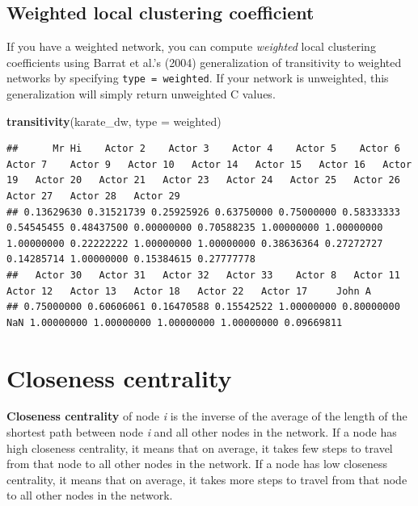 \documentclass[
]{book}
\newenvironment{Shaded}{\begin{snugshade}}{\end{snugshade}}
\newcommand{\AttributeTok}[1]{\textcolor[rgb]{0.13,0.29,0.53}{#1}}
\newcommand{\FunctionTok}[1]{\textcolor[rgb]{0.13,0.29,0.53}{\textbf{#1}}}
\newcommand{\NormalTok}[1]{#1}
\newcommand{\StringTok}[1]{\textcolor[rgb]{0.31,0.60,0.02}{#1}}
\begin{document}
\subsection{Weighted local clustering coefficient}\label{weighted-local-clustering-coefficient}

If you have a weighted network, you can compute \emph{weighted} local clustering coefficients using Barrat et al.'s (2004) generalization of transitivity to weighted networks by specifying \texttt{type\ =\ \textquotesingle{}weighted\textquotesingle{}}. If your network is unweighted, this generalization will simply return unweighted C values.

\begin{Shaded}
\begin{Highlighting}[]
\FunctionTok{transitivity}\NormalTok{(karate\_dw, }\AttributeTok{type =} \StringTok{\textquotesingle{}weighted\textquotesingle{}}\NormalTok{)}
\end{Highlighting}
\end{Shaded}

\begin{verbatim}
##      Mr Hi    Actor 2    Actor 3    Actor 4    Actor 5    Actor 6    Actor 7    Actor 9   Actor 10   Actor 14   Actor 15   Actor 16   Actor 19   Actor 20   Actor 21   Actor 23   Actor 24   Actor 25   Actor 26   Actor 27   Actor 28   Actor 29 
## 0.13629630 0.31521739 0.25925926 0.63750000 0.75000000 0.58333333 0.54545455 0.48437500 0.00000000 0.70588235 1.00000000 1.00000000 1.00000000 0.22222222 1.00000000 1.00000000 0.38636364 0.27272727 0.14285714 1.00000000 0.15384615 0.27777778 
##   Actor 30   Actor 31   Actor 32   Actor 33    Actor 8   Actor 11   Actor 12   Actor 13   Actor 18   Actor 22   Actor 17     John A 
## 0.75000000 0.60606061 0.16470588 0.15542522 1.00000000 0.80000000        NaN 1.00000000 1.00000000 1.00000000 1.00000000 0.09669811
\end{verbatim}

\section{Closeness centrality}\label{closeness-centrality}

\textbf{Closeness centrality} of node \emph{i} is the inverse of the average of the length of the shortest path between node \emph{i} and all other nodes in the network. If a node has high closeness centrality, it means that on average, it takes few steps to travel from that node to all other nodes in the network. If a node has low closeness centrality, it means that on average, it takes more steps to travel from that node to all other nodes in the network.
\end{document}
